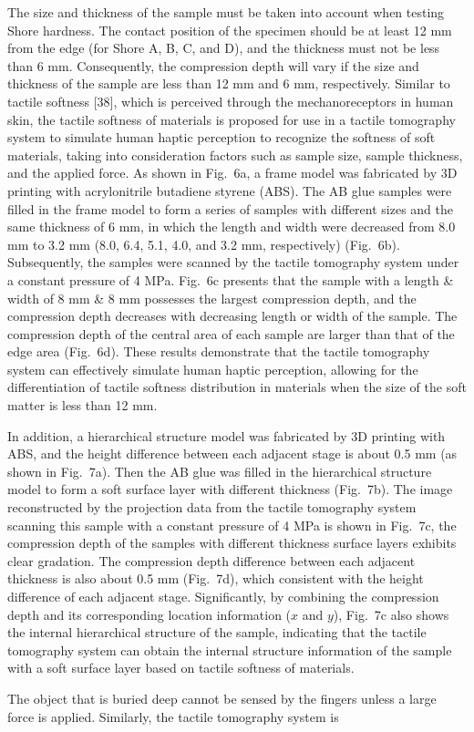 \documentclass[11pt]{article}
\begin{document}
The size and thickness of the sample must be taken into account when
testing Shore hardness. The contact position of the specimen should
be at least 12 mm from the edge (for Shore A, B, C, and D), and the
thickness must not be less than 6 mm. Consequently, the compression
depth will vary if the size and thickness of the sample are less
than 12 mm and 6 mm, respectively. Similar to tactile softness [38],
which is perceived through the mechanoreceptors in human skin, the
tactile softness of materials is proposed for use in a tactile
tomography system to simulate human haptic perception to recognize
the softness of soft materials, taking into consideration factors
such as sample size, sample thickness, and the applied force. As
shown in Fig.~6a, a frame model was fabricated by 3D printing with
acrylonitrile butadiene styrene (ABS). The AB glue samples were
filled in the frame model to form a series of samples with different
sizes and the same thickness of 6 mm, in which the length and width
were decreased from 8.0 mm to 3.2 mm (8.0, 6.4, 5.1, 4.0, and 3.2
mm, respectively) (Fig.~6b). Subsequently, the samples were scanned
by the tactile tomography system under a constant pressure of 4 MPa.
Fig.~6c presents that the sample with a length \& width of 8 mm \&
8 mm possesses the largest compression depth, and the compression
depth decreases with decreasing length or width of the sample. The
compression depth of the central area of each sample are larger than
that of the edge area (Fig.~6d). These results demonstrate that the
tactile tomography system can effectively simulate human haptic
perception, allowing for the differentiation of tactile softness
distribution in materials when the size of the soft matter is less
than 12 mm.

In addition, a hierarchical structure model was fabricated by 3D
printing with ABS, and the height difference between each adjacent
stage is about 0.5 mm (as shown in Fig.~7a). Then the AB glue was
filled in the hierarchical structure model to form a soft surface
layer with different thickness (Fig.~7b). The image reconstructed by
the projection data from the tactile tomography system scanning this
sample with a constant pressure of 4 MPa is shown in Fig.~7c, the
compression depth of the samples with different thickness surface
layers exhibits clear gradation. The compression depth difference
between each adjacent thickness is also about 0.5 mm (Fig.~7d),
which consistent with the height difference of each adjacent stage.
Significantly, by combining the compression depth and its
corresponding location information ($x$ and $y$), Fig.~7c also
shows the internal hierarchical structure of the sample, indicating
that the tactile tomography system can obtain the internal structure
information of the sample with a soft surface layer based on tactile
softness of materials.

The object that is buried deep cannot be sensed by the fingers
unless a large force is applied. Similarly, the tactile tomography
system is
\end{document}
